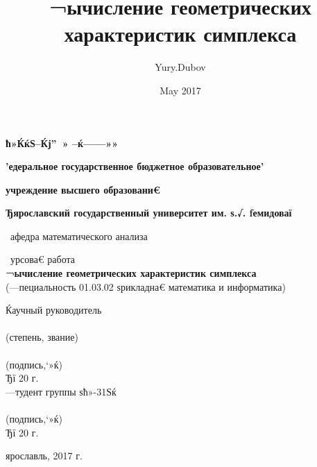 \documentclass[12pt]{article} %
\title{¬ычисление геометрических характеристик симплекса}
\author{Yury.Dubov}
\date{May 2017}
\begin{document}
	\begin{titlepage}
		 \begin{center}
			\large
			\textbf{ћ»ЌќЅ–Ќј” » –ќ——»»}
			
			
			\vspace{0.5cm}
			
		\textbf{'едеральное государственное бюджетное образовательное'}
		
		\textbf{учреждение высшего образовани€}
		
		\textbf{Ђярославский государственный университет им. ѕ.√. ƒемидоваї}
			\vspace{0.25cm}
			
			
			 афедра математического анализа
			\vfill
			
			 урсова€ работа \\
			\textbf{¬ычисление геометрических характеристик симплекса} \\
			(—пециальность 01.03.02 ѕрикладна€ математика и информатика) 
			\vfill
			
			
			\bigskip
			
			
		\end{center}

\begin{flushright}
Ќаучный руководитель\\
\underline{\hspace{5cm}}\\
 \small(степень, звание)\\
 \underline{\hspace{2.5cm}} \hspace{0.1cm}  \underline{\hspace{2.5cm}}\\
 \small(подпись,‘»ќ)\\
 Ђ\underline{\hspace{0.5cm}}ї \underline{\hspace{1.5cm}} 20 \underline{\hspace{0.2cm}} г.\\
 —тудент группы ѕћ»-31Ѕќ\\
 \underline{\hspace{2.5cm}} \hspace{0.1cm}  \underline{\hspace{2.5cm}}\\
 \small(подпись,‘»ќ)\\
 Ђ\underline{\hspace{0.5cm}}ї \underline{\hspace{1.5cm}} 20 \underline{\hspace{0.2cm}} г.\\
\end{flushright}
		\begin{center}
			ярославль, 2017 г.
		\end{center}
\end{titlepage}
\end{document}
